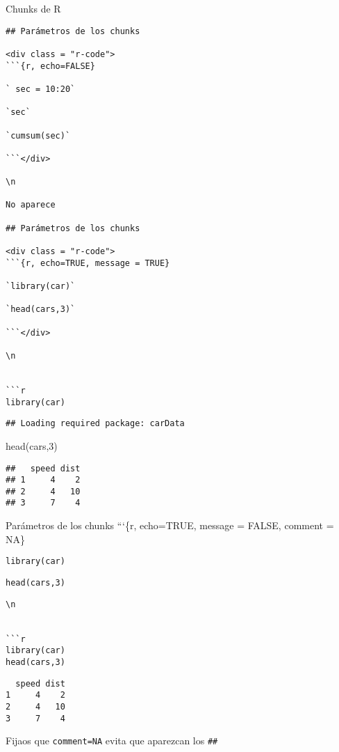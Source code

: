 \documentclass[
  ignorenonframetext,
]{beamer}
\newenvironment{Shaded}{\begin{snugshade}}{\end{snugshade}}
\newcommand{\DecValTok}[1]{\textcolor[rgb]{0.00,0.00,0.81}{#1}}
\newcommand{\FunctionTok}[1]{\textcolor[rgb]{0.00,0.00,0.00}{#1}}
\newcommand{\NormalTok}[1]{#1}
\begin{document}
\begin{frame}[fragile]{Chunks de R}
\begin{verbatim}
## Parámetros de los chunks

<div class = "r-code">
```{r, echo=FALSE}

` sec = 10:20`

`sec`

`cumsum(sec)`

```</div>

\n

No aparece

## Parámetros de los chunks

<div class = "r-code">
```{r, echo=TRUE, message = TRUE}

`library(car)`

`head(cars,3)`

```</div>

\n


```r
library(car)
\end{verbatim}

\begin{verbatim}
## Loading required package: carData
\end{verbatim}

\begin{Shaded}
\begin{Highlighting}[]
\FunctionTok{head}\NormalTok{(cars,}\DecValTok{3}\NormalTok{)}
\end{Highlighting}
\end{Shaded}

\begin{verbatim}
##   speed dist
## 1     4    2
## 2     4   10
## 3     7    4
\end{verbatim}
\end{frame}

\begin{frame}[fragile]{Parámetros de los chunks}
\protect\hypertarget{paruxe1metros-de-los-chunks}{}
```\{r, echo=TRUE, message = FALSE, comment = NA\}

\texttt{library(car)}

\texttt{head(cars,3)}

\begin{verbatim}
\n


```r
library(car)
head(cars,3)
\end{verbatim}

\begin{verbatim}
  speed dist
1     4    2
2     4   10
3     7    4
\end{verbatim}

Fijaos que \texttt{comment=NA} evita que aparezcan los \texttt{\#\#}
\end{frame}
\end{document}
